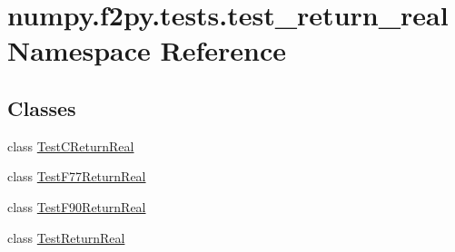 \hypertarget{namespacenumpy_1_1f2py_1_1tests_1_1test__return__real}{}\section{numpy.\+f2py.\+tests.\+test\+\_\+return\+\_\+real Namespace Reference}
\label{namespacenumpy_1_1f2py_1_1tests_1_1test__return__real}
\subsection*{Classes}
\begin{DoxyCompactItemize}
\item 
class \hyperlink{classnumpy_1_1f2py_1_1tests_1_1test__return__real_1_1TestCReturnReal}{Test\+C\+Return\+Real}
\item 
class \hyperlink{classnumpy_1_1f2py_1_1tests_1_1test__return__real_1_1TestF77ReturnReal}{Test\+F77\+Return\+Real}
\item 
class \hyperlink{classnumpy_1_1f2py_1_1tests_1_1test__return__real_1_1TestF90ReturnReal}{Test\+F90\+Return\+Real}
\item 
class \hyperlink{classnumpy_1_1f2py_1_1tests_1_1test__return__real_1_1TestReturnReal}{Test\+Return\+Real}
\end{DoxyCompactItemize}
